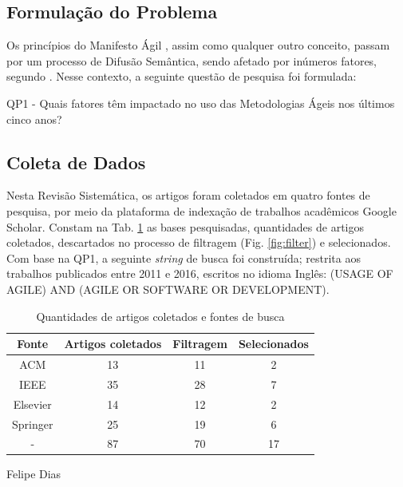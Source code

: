 \subsection{Formulação do Problema}
Os princípios do Manifesto Ágil \cite{Beck2001}, assim como qualquer outro conceito, passam por um processo de Difusão Semântica, sendo afetado por inúmeros fatores,  segundo \citeauthor{sematicDiffusion} \citeyear{sematicDiffusion}. Nesse contexto, a seguinte questão de pesquisa foi formulada: \newline

QP1 - Quais fatores têm impactado no uso das Metodologias Ágeis nos últimos cinco anos? \newline

\subsection{Coleta de Dados}
Nesta Revisão Sistemática, os artigos foram coletados em quatro fontes de pesquisa, por meio da plataforma de indexação de trabalhos acadêmicos Google Scholar. Constam na Tab. \ref{tab:tableNumberOfArticles} as bases pesquisadas, quantidades de artigos coletados, descartados no processo de filtragem (Fig. \ref{fig:filter}) e selecionados. Com base na QP1, a seguinte \textit{string} de busca foi construída; restrita aos trabalhos publicados entre 2011 e 2016, escritos no idioma Inglês: \newline \newline (USAGE OF AGILE) AND \newline (AGILE OR SOFTWARE OR DEVELOPMENT).

\begin{table}[!htb]
\centering
\caption{Quantidades de artigos coletados e fontes de busca}
	\label{tab:tableNumberOfArticles}
\begin{tabular}{c|c|c|c}
\hline
{\bf Fonte} & \bf {Artigos coletados} & {\bf Filtragem} & {\bf Selecionados}\\ 
\hline
ACM & 13 & 11 & 2 \\ 
\hline
IEEE & 35 & 28 & 7 \\ 
\hline
Elsevier & 14 & 12 & 2\\ 
\hline
Springer & 25 & 19 & 6\\ 
\hline
{-} & 87 & 70 & 17\\ 
\hline
\end{tabular}
 Felipe Dias
\end{table}

